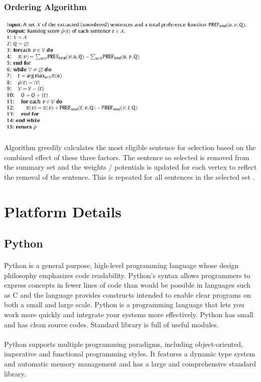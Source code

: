 \subsubsection{Ordering Algorithm}
\includegraphics[scale=0.75]{my/images/algorithm}
\paragraph{} Algorithm greedily calculates the most eligible sentence for selection based on the combined effect of these three factors. The sentence so selected is removed from the summary set and the weights / potentials is updated for each vertex to reflect the removal of the sentence. This is repeated for all sentences in the selected set .  


\section{Platform Details}
\subsection{Python}

\paragraph{} Python is a general purpose, high-level programming language whose design philosophy emphasizes code readability. Python's syntax allows programmers to express concepts in fewer lines of code than would be possible in languages such as C and the language provides constructs intended to enable clear programs on both a small and large scale. Python is a programming language that lets you work more quickly and integrate your systems more effectively. Python has small and has clean source codes. Standard library is full of useful modules.
\paragraph{} Python supports multiple programming paradigms, including object-oriented, imperative and functional programming styles. It features a dynamic type system and automatic memory management and has a large and comprehensive standard library.

